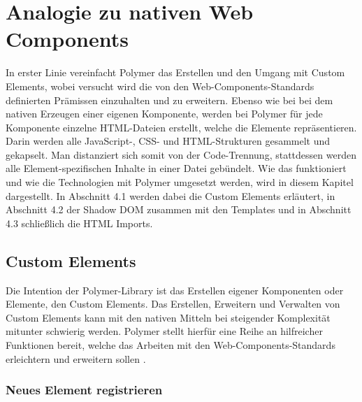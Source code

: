 \chapter{Analogie zu nativen Web Components}\label{analogie-zu-nativen-web-components}

In erster Linie vereinfacht Polymer das Erstellen und den Umgang mit Custom Elements, wobei versucht wird die von den Web-Components-Standards definierten Prämissen einzuhalten und zu erweitern. Ebenso wie bei bei dem nativen Erzeugen einer eigenen Komponente, werden bei Polymer für jede Komponente einzelne HTML-Dateien erstellt, welche die Elemente repräsentieren. Darin werden alle JavaScript-, CSS- und HTML-Strukturen gesammelt und gekapselt. Man distanziert sich somit von der Code-Trennung, stattdessen werden alle Element-spezifischen Inhalte in einer Datei gebündelt. Wie das funktioniert und wie die Technologien mit Polymer umgesetzt werden, wird in diesem Kapitel dargestellt. In Abschnitt 4.1 werden dabei die Custom Elements erläutert, in Abschnitt 4.2 der Shadow DOM zusammen mit den Templates und in Abschnitt 4.3 schließlich die HTML Imports.


\section{Custom Elements}\label{custom-elements}

Die Intention der Polymer-Library ist das Erstellen eigener Komponenten oder Elemente, den Custom Elements. Das Erstellen, Erweitern und Verwalten von Custom Elements kann mit den nativen Mitteln bei steigender Komplexität mitunter schwierig werden. Polymer stellt hierfür eine Reihe an hilfreicher Funktionen bereit, welche das Arbeiten mit den Web-Components-Standards erleichtern und erweitern sollen \cite{citeulike:13915080}.


\subsection{Neues Element registrieren}\label{neues-element-registrieren}

